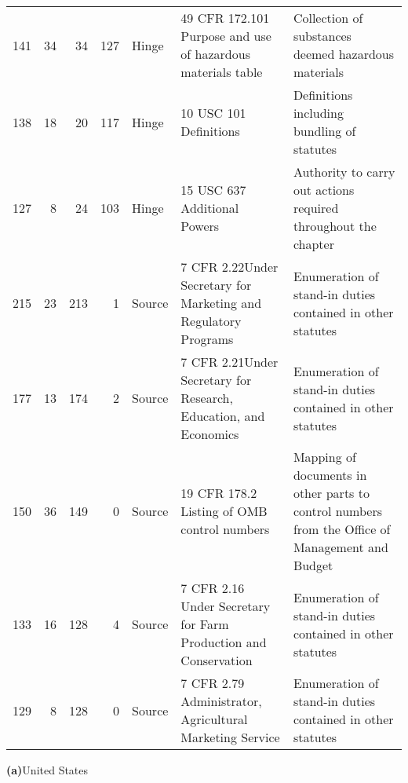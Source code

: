 \documentclass[utf8,sort&compress,table,hidelinks]{frontiersFPHY} %
\begin{document}
\begin{table}
\begin{tabular}{rrrrlp{}p{}}
   \rowcolor{lightgray!30}141 &      34 &           34 &          127 & Hinge           & 49 CFR 172.101 Purpose and use of hazardous materials table                  & Collection of substances deemed hazardous materials                       \\
   138 &      18 &           20 &          117 & Hinge           & 10 USC 101 Definitions                                                   & Definitions including bundling of statutes                       \\
   127 &       8 &           24 &          103 & Hinge           & 15 USC 637 Additional Powers                                              & Authority to carry out actions required throughout the chapter                      \\
   \rowcolor{lightgray!30}215 &      23 &          213 &            1 & Source          & 7 CFR 2.22\newline Under Secretary for Marketing and Regulatory Programs            & Enumeration of stand-in duties contained in other statutes                       \\
   \rowcolor{lightgray!30}177 &      13 &          174 &            2 & Source          & 7 CFR 2.21\newline Under Secretary for Research, Education, and Economics            &  Enumeration of stand-in duties contained in other statutes                      \\
   \rowcolor{lightgray!30}150 &      36 &          149 &            0 & Source          & 19 CFR 178.2 Listing of OMB control numbers                                 & Mapping of documents in other parts to control numbers from the Office of Management and Budget                      \\
   \rowcolor{lightgray!30}133 &      16 &          128 &            4 & Source          & 7 CFR 2.16 Under Secretary for Farm Production and Conservation              & Enumeration of stand-in duties contained in other statutes                     \\
   \rowcolor{lightgray!30}129 &       8 &          128 &            0 & Source          & 7 CFR 2.79 Administrator, Agricultural Marketing Service                     & Enumeration of stand-in duties contained in other statutes                          \\
\bottomrule
\end{tabular}
			
{\vspace*{3pt}\small \textbf{\textsf{(a)}}\quad United States}\vspace*{6pt}
	

\end{table}
\end{document}
